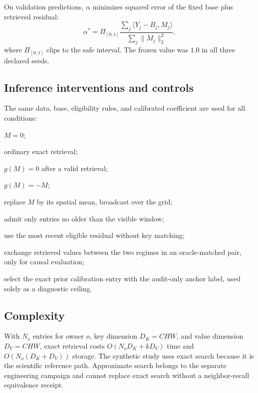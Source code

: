 \documentclass[11pt]{article}
\begin{document}
On validation predictions, $\alpha$ minimizes squared error of the fixed base
plus retrieved residual:
\begin{equation}
 \alpha^*=\Pi_{[0,1]}
 \frac{\sum_j\langle Y_j-B_j,M_j\rangle}
 {\sum_j\|M_j\|_2^2},
\end{equation}
where $\Pi_{[0,1]}$ clips to the safe interval. The frozen value was $1.0$ in
all three declared seeds.

\subsection{Inference interventions and controls}

The same data, base, eligibility rules, and calibrated coefficient are used for
all conditions:

\begin{description}[leftmargin=2.1cm,style=nextline]
  \item[no memory] $M=0$;
  \item[tensor memory] ordinary exact retrieval;
  \item[erase] $g(M)=0$ after a valid retrieval;
  \item[sign flip] $g(M)=-M$;
  \item[vector broadcast] replace $M$ by its spatial mean, broadcast over the grid;
  \item[recent only] admit only entries no older than the visible window;
  \item[last value] use the most recent eligible residual without key matching;
  \item[paired swap] exchange retrieved values between the two regimes in an
  oracle-matched pair, only for causal evaluation;
  \item[oracle anchor] select the exact prior calibration entry with the
  audit-only anchor label, used solely as a diagnostic ceiling.
\end{description}

\subsection{Complexity}

With $N_o$ entries for owner $o$, key dimension $D_K=CHW$, and value dimension
$D_V=CHW$, exact retrieval costs $O(N_oD_K+ kD_V)$ time and
$O(N_o(D_K+D_V))$ storage. The synthetic study uses exact search because it is
the scientific reference path. Approximate search belongs to the separate
engineering campaign and cannot replace exact search without a neighbor-recall
equivalence receipt.
\end{document}
